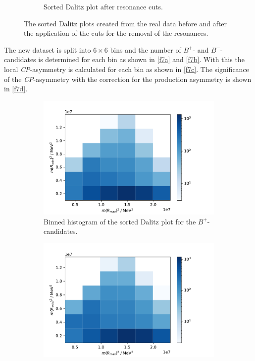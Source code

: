 \begin{figure}[H]
\begin{subfigure}{0.49\textwidth}
    \caption{Sorted Dalitz plot after resonance cuts.}
    \label{f6c}
  \end{subfigure}
  \caption{The sorted Dalitz plots created from the real data before and after the application of the cuts for the removal of the resonances.}
  \label{f6}
\end{figure}

The new dataset is split into $6 \times 6$ bins and the number of $B^+$- and $B^-$-candidates is determined for each bin as shown in
\autoref{f7a} and \ref{f7b}. With this the local \textit{CP}-asymmetry is calculated for each bin as shown in \autoref{f7c}.
The significance of the \textit{CP}-asymmetry with the correction for the production asymmetry is shown in \autoref{f7d}.

\begin{figure}[H]
  \centering
  \begin{subfigure}{0.49\textwidth}
    \includegraphics[width=\textwidth]{plots/Dalitz_sorted_bin_cut_bp.pdf}
    \caption{Binned histogram of the sorted Dalitz plot for the $B^+$-candidates.}
    \label{f7a}
  \end{subfigure}
  \begin{subfigure}{0.49\textwidth}
    \includegraphics[width=\textwidth]{plots/Dalitz_sorted_bin_cut_bm.pdf}

\end{subfigure}
\end{figure}
